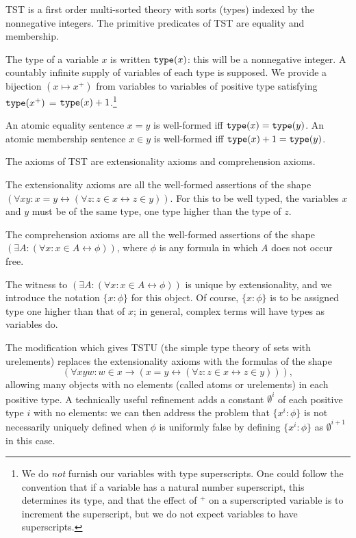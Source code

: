 \documentclass[112pt]{article}
\theoremstyle{definition}
\theoremstyle{remark}
\begin{document}
TST is a first order multi-sorted theory with sorts (types) indexed by the nonnegative integers.  The primitive predicates of TST are equality and membership.

The type of a variable $x$ is written ${\tt type}(x)$:  this will be a nonnegative integer.   A countably infinite supply of variables of each type is supposed.   We provide a bijection $(x \mapsto x^+)$ from variables to variables of positive type satisfying   ${\tt type}(x^+)$ = ${\tt type}(x)+1$.\footnote{We do {\em not\/} furnish our variables with type superscripts.  One could follow the convention that if a variable has a natural number superscript, this determines its type, and that the effect of $^+$ on a superscripted variable is to increment the superscript, but we do not expect variables to have superscripts.}

An atomic equality sentence $x=y$ is well-formed iff ${\tt type}(x)={\tt type}(y)$. An atomic membership sentence $x \in y$ is well-formed iff ${\tt type}(x)+1 = {\tt type}(y)$.

The axioms of TST are extensionality axioms and comprehension axioms.

The extensionality axioms are all the well-formed assertions of the shape $(\forall xy:x=y \leftrightarrow (\forall z:z \in x \leftrightarrow z\in y))$.  For this to be well typed, the variables
$x$ and $y$ must be of the same type, one type higher than the type of $z$.

The comprehension axioms are all the well-formed assertions of the shape $(\exists A:(\forall x:x \in A \leftrightarrow \phi))$, where $\phi$ is any formula in which $A$ does not occur free.

The witness to $(\exists A:(\forall x:x \in A \leftrightarrow \phi))$ is unique by extensionality, and we introduce the notation $\{x:\phi\}$ for this object.  Of course, $\{x:\phi\}$  is to be assigned type one higher than that of $x$;  in general, complex terms will have types as variables do.

The modification which gives TSTU (the simple type theory of sets with urelements) replaces the extensionality axioms with the formulas of the shape $$(\forall xyw:w \in x \rightarrow (x=y \leftrightarrow (\forall z:z \in x \leftrightarrow z\in y))),$$  allowing many objects with no elements (called atoms or urelements)  in each positive type.  A technically useful refinement adds a constant $\emptyset^i$ of each positive type $i$ with no elements:  we can then address the problem that $\{x^i:\phi\}$ is not necessarily  uniquely defined when $\phi$ is uniformly false by defining $\{x^i:\phi\}$ as $\emptyset^{i+1}$ in this case.
\end{document}
